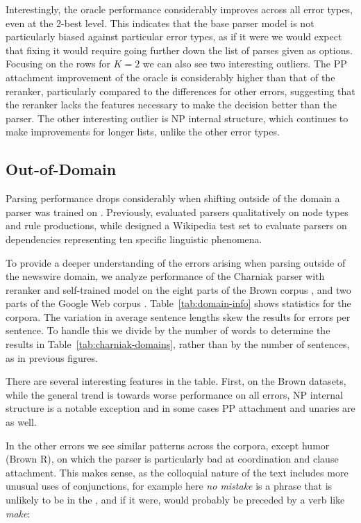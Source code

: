Interestingly, the oracle performance considerably improves across all error types, even at the 2-best level.
This indicates that the base parser model is not particularly biased against particular error types, as if it were we would expect that fixing it would require going further down the list of parses given as options.
Focusing on the rows for $K=2$ we
can also see two interesting outliers.  The PP attachment improvement of the
oracle is considerably higher than that of the reranker, particularly compared
to the differences for other errors, suggesting that the reranker lacks the
features necessary to make the decision better than the parser.  The other
interesting outlier is NP internal structure, which continues to make
improvements for longer lists, unlike the other error types.

\subsection{Out-of-Domain} \label{sec:out-of-domain}

Parsing performance drops considerably when shifting outside of the domain a
parser was trained on \parencite{Gildea:2001}.
Previously, \textcite{Clegg:2005:EIT:1626315.1626317} evaluated parsers qualitatively on
node types and rule productions, while  \textcite{Bender:2011:PEO:2145432.2145479}
designed a Wikipedia test set to evaluate parsers on dependencies representing
ten specific linguistic phenomena.

To provide a deeper understanding of the errors arising when parsing outside of
the newswire domain, we analyze performance of the Charniak parser with
reranker and self-trained model on the eight parts of the Brown corpus
\parencite{ptb}, and two parts of the Google Web
corpus \parencite{Petrov:2012}.  Table~\ref{tab:domain-info} shows statistics for
the corpora.  The variation in average sentence lengths skew the results for
errors per sentence.  To handle this we divide by the number of words to
determine the results in Table~\ref{tab:charniak-domains}, rather than by the
number of sentences, as in previous figures.

There are several interesting features in the table.  First, on the Brown
datasets, while the general trend is towards worse performance on all errors,
NP internal structure is a notable exception and in some cases PP attachment
and unaries are as well.

In the other errors we see similar patterns across the corpora, except humor
(Brown R), on which the parser is particularly bad at coordination and clause
attachment.  This makes sense, as the colloquial nature of the text includes
more unusual uses of conjunctions, for example here \emph{no mistake} is a phrase that is unlikely to be in the \wsj, and if it were, would probably be preceded by a verb like \emph{make}:


